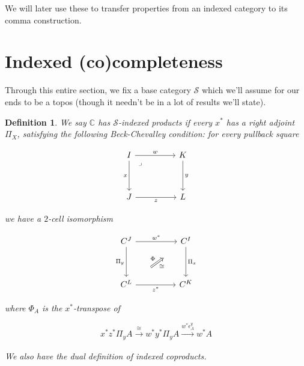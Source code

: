 \documentclass[10pt, oneside]{article}
\newtheorem{definition}[theorem]{Definition}
\begin{document}
We will later use these to transfer properties from an indexed category to its comma construction.

\section{Indexed (co)completeness}

Through this entire section, we fix a base category $\mathcal{S}$ which we'll assume for our ends to be a topos (though it needn't be in a lot of results we'll state).

\begin{definition}
    We say $\mathbb{C}$ has $\mathcal{S}$-indexed products if every $x^\ast$ has a right adjoint $\Pi_X$, satisfying the following Beck-Chevalley condition: for every pullback square

    \[\begin{tikzcd}[ampersand replacement=\&]
	I \&\& K \\
	\\
	J \&\& L
	\arrow["w", from=1-1, to=1-3]
	\arrow["x"', from=1-1, to=3-1]
	\arrow["z"', from=3-1, to=3-3]
	\arrow["y", from=1-3, to=3-3]
	\arrow["\lrcorner"{anchor=center, pos=0.125}, draw=none, from=1-1, to=3-3]
\end{tikzcd}\]

    \noindent we have a $2$-cell isomorphism

    \[\begin{tikzcd}[ampersand replacement=\&]
	{C^J} \&\& {C^I} \\
	\\
	{C^L} \&\& {C^K}
	\arrow["{\Pi_y}"', from=1-1, to=3-1]
	\arrow["{\Pi_x}", from=1-3, to=3-3]
	\arrow["{w^\ast}", from=1-1, to=1-3]
	\arrow["{z^\ast}"', from=3-1, to=3-3]
	\arrow["\Phi", shorten <=22pt, shorten >=22pt, Rightarrow, from=3-1, to=1-3]
	\arrow["\cong"', draw=none, from=3-1, to=1-3]
\end{tikzcd}\]
    
    \noindent where $\Phi_A$ is the $x^\ast$-transpose of

    $$x^\ast z^\ast \Pi_y A \xrightarrow[]{\cong} w^\ast y^\ast \Pi_y A \xrightarrow[]{w^\ast \epsilon^y_A} w^\ast A$$

    We also have the dual definition of indexed coproducts.
\end{definition}
\end{document}
